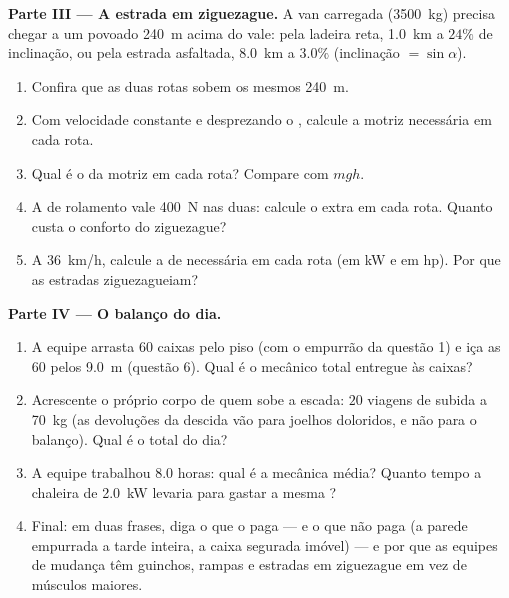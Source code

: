 \begin{problem}
\medskip
\noindent\textbf{Parte III --- A estrada em ziguezague.}
A van carregada (\qty{3500}{kg}) precisa chegar a um povoado
\qty{240}{m} acima do vale: pela ladeira reta, \qty{1.0}{km} a $24\%$ de
inclinação, ou pela estrada asfaltada, \qty{8.0}{km} a $3.0\%$
(inclinação $= \sin\alpha$).
\begin{enumerate}[resume]
  \item Confira que as duas rotas sobem os mesmos \qty{240}{m}.
  \item Com velocidade constante e desprezando o , calcule a 
        motriz necessária em cada rota.
  \item Qual é o  da  motriz em cada rota? Compare com
        $mgh$.
  \item A  de rolamento vale \qty{400}{N} nas duas: calcule o
         extra em cada rota. Quanto custa o conforto do
        ziguezague?
  \item A \qty{36}{km/h}, calcule a  de  necessária em cada
        rota (em \unit{kW} e em \unit{hp}). Por que as estradas
        ziguezagueiam?
\end{enumerate}

\medskip
\noindent\textbf{Parte IV --- O balanço do dia.}
\begin{enumerate}[resume]
  \item A equipe arrasta $60$ caixas pelo piso (com o empurrão da questão
        1) e iça as $60$ pelos \qty{9.0}{m} (questão 6). Qual é o
         mecânico total entregue às caixas?
  \item Acrescente o próprio corpo de quem sobe a escada: $20$ viagens de
        subida a \qty{70}{kg} (as devoluções da descida vão para joelhos
        doloridos, e não para o balanço). Qual é o total do dia?
  \item A equipe trabalhou $8.0$ horas: qual é a  mecânica média?
        Quanto tempo a chaleira de \qty{2.0}{kW} levaria para gastar a
        mesma ?
  \item Final: em duas frases, diga o que o  paga --- e o que não
        paga (a parede empurrada a tarde inteira, a caixa segurada imóvel)
        --- e por que as equipes de mudança têm guinchos, rampas e
        estradas em ziguezague em vez de músculos maiores.
\end{enumerate}
\end{problem}
